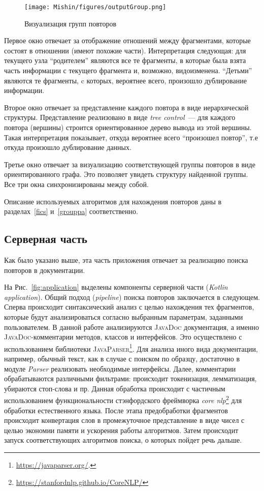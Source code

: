 \begin{figure}[h!]
    \centering
    \texttt{[image: Mishin/figures/outputGroup.png]}
    \caption{Визуализация групп повторов}\label{fig:groupViz}
\end{figure}


Первое окно отвечает за  отображение отношений между фрагментами, которые состоят в отношении (имеют похожие части).
Интерпретация следующая: для текущего узла ``родителем'' являются все те фрагменты, в которые была взята часть информации с текущего фрагмента и, возможно, видоизменена.
``Детьми'' являются те фрагменты, c которых, вероятнее всего, произошло дублирование информации.

Второе окно отвечает за представление каждого повтора в виде иерархической структуры.
Представление реализовано в виде \emph{tree control}~--- для каждого повтора (вершины) строится ориентированное дерево вывода из этой вершины.
Такая интерпретация показывает, откуда вероятнее всего ``произошел повтор'', т.е откуда произошло дублирование данных.

Третье окно отвечает за визуализацию соответствующей группы повторов в виде ориентированного графа.
Это позволяет увидеть структуру найденной группы.
Все три окна синхронизированы между собой.

Описание используемых алгоритмов для нахождения повторов даны в разделах~\ref{fics} и~\ref{grouppa} соответственно.


\subsection{Серверная часть}\label{server}
Как было указано выше, эта часть приложения отвечает за реализацию поиска повторов в документации.

На Рис.~\ref{fig:application} выделены компоненты серверной части (\emph{Kotlin application}).
Общий подход (\emph{pipeline}) поиска повторов заключается в следующем.
Сперва происходит синтаксический анализ с целью нахождения тех фрагментов, которые будут анализироваться согласно выбранным параметрам, заданными пользователем.
В данной работе анализируются \textsc{JavaDoc} документация, а именно \textsc{JavaDoc}-комментарии методов, классов и интерфейсов.
Это осуществлено с использованием библиотеки \textsc{JavaParser}\footnote{\url{https://javaparser.org/}.}.
Для анализа иного вида документации, например, обычный текст, как в случае с поиском по образцу, достаточно в модуле \emph{Parser} реализовать необходимые интерфейсы.
Далее, комментарии обрабатываются различными фильтрами: происходит токенизация, лемматизация, убираются стоп-слова и пр.
 Данная обработка происходит с частичным использованием функциональности стэнфордского фреймворка \emph{core nlp}\footnote{\url{https://stanfordnlp.github.io/CoreNLP/}} для обработки естественного языка.
После этапа предобработки фрагментов происходит конвертация слов в промежуточное представление в виде чисел с целью экономии памяти и ускорения работы алгоритмов.
Затем происходит запуск соответствующих алгоритмов поиска, о которых пойдет речь дальше.


